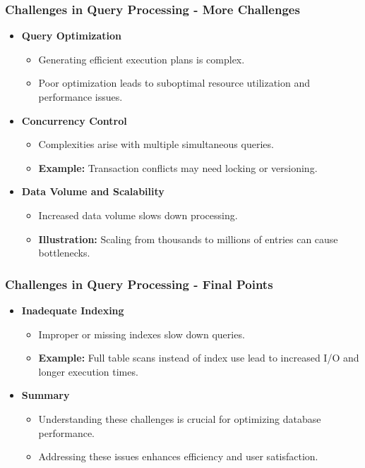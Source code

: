 \documentclass[aspectratio=169]{beamer}
\begin{document}
\begin{frame}[fragile]
    \frametitle{Challenges in Query Processing - More Challenges}
    \begin{itemize}
        \item \textbf{Query Optimization}
            \begin{itemize}
                \item Generating efficient execution plans is complex.
                \item Poor optimization leads to suboptimal resource utilization and performance issues.
            \end{itemize}
        
        \item \textbf{Concurrency Control}
            \begin{itemize}
                \item Complexities arise with multiple simultaneous queries.
                \item \textbf{Example:} Transaction conflicts may need locking or versioning.
            \end{itemize}
        
        \item \textbf{Data Volume and Scalability}
            \begin{itemize}
                \item Increased data volume slows down processing.
                \item \textbf{Illustration:} Scaling from thousands to millions of entries can cause bottlenecks.
            \end{itemize}
    \end{itemize}
\end{frame}

\begin{frame}[fragile]
    \frametitle{Challenges in Query Processing - Final Points}
    \begin{itemize}
        \item \textbf{Inadequate Indexing}
            \begin{itemize}
                \item Improper or missing indexes slow down queries.
                \item \textbf{Example:} Full table scans instead of index use lead to increased I/O and longer execution times.
            \end{itemize}
        
        \item \textbf{Summary}
            \begin{itemize}
                \item Understanding these challenges is crucial for optimizing database performance.
                \item Addressing these issues enhances efficiency and user satisfaction.
            \end{itemize}
    \end{itemize}
\end{frame}
\end{document}
